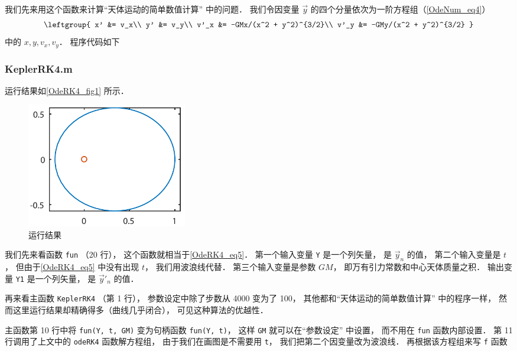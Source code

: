 我们先来用这个函数来计算“天体运动的简单数值计算” 中的问题． 我们令因变量 $\vec y$ 的四个分量依次为一阶方程组（\autoref{OdeNum_eq4}）
\begin{equation}\label{OdeRK4_eq5}
\leftgroup{
x' &= v_x\\
y' &= v_y\\
v'_x &= -GMx/(x^2 + y^2)^{3/2}\\
v'_y &= -GMy/(x^2 + y^2)^{3/2}
}\end{equation}
中的 $x, y, v_x, v_y$． 程序代码如下

\subsubsection{KeplerRK4.m}


运行结果如\autoref{OdeRK4_fig1} 所示．

\begin{figure}[ht]
\centering
\includegraphics[width=7cm]{./figures/OdeRK4.pdf}
\caption{运行结果} \label{OdeRK4_fig1}
\end{figure}

我们先来看函数 \texttt{fun} （20 行）， 这个函数就相当于\autoref{OdeRK4_eq5}． 第一个输入变量 \texttt{Y} 是一个列矢量， 是 $\vec y_n$ 的值， 第二个输入变量是 $t$， 但由于\autoref{OdeRK4_eq5} 中没有出现 $t$， 我们用波浪线代替． 第三个输入变量是参数 $GM$， 即万有引力常数和中心天体质量之积． 输出变量 \texttt{Y1} 是一个列矢量， 是 $\vec y'_n$ 的值．

再来看主函数 \texttt{KeplerRK4} （第 1 行）， 参数设定中除了步数从 4000 变为了 100， 其他都和“天体运动的简单数值计算” 中的程序一样， 然而这里运行结果却精确得多（曲线几乎闭合）， 可见这种算法的优越性．

主函数第 10 行中将 \texttt{fun(Y, t, GM)} 变为句柄函数 \texttt{fun(Y, t)}， 这样 \texttt{GM} 就可以在“参数设定” 中设置， 而不用在 \texttt{fun} 函数内部设置． 第 11 行调用了上文中的 \texttt{odeRK4} 函数解方程组， 由于我们在画图是不需要用 \texttt{t}， 我们把第二个因变量改为波浪线．
再根据该方程组来写 \texttt{f} 函数









